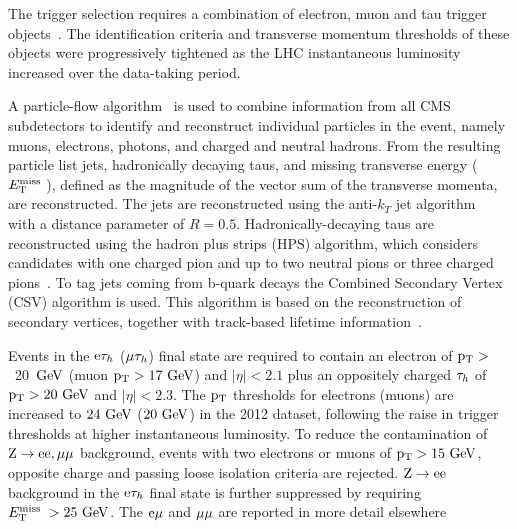 The trigger selection requires a combination of electron, muon and tau trigger objects~\cite{CMS-PAS-EGM-10-004,CMS-PAS-MUO-10-002,CMS-EWK-TAU}. The identification criteria and transverse momentum thresholds of these objects were progressively tightened as the LHC instantaneous luminosity increased over the data-taking period.

A particle-flow algorithm~\cite{CMS-PAS-PFT-09-001,CMS-PAS-PFT-10-002,CMS-PAS-PFT-10-003} is used to combine information from all CMS subdetectors to identify and reconstruct individual particles in the event, namely muons, electrons, photons, and charged and neutral hadrons. From the resulting particle list jets, hadronically decaying taus, and missing transverse energy ($E_\mathrm{T}^{\mathrm{miss}}\;$), defined as the magnitude of the vector sum of the transverse momenta, are reconstructed. 
The jets are reconstructed using the anti-$k_T$ jet algorithm~\cite{Cacciari:fastjet1,Cacciari:fastjet2} with a distance parameter of $R=0.5$. Hadronically-decaying taus are reconstructed using the hadron plus strips (HPS) algorithm, which considers candidates with one charged pion and up to two neutral pions or three charged pions~\cite{CMS-PAS-TAU-11-001}. To tag jets coming from b-quark decays the Combined Secondary Vertex (CSV) algorithm is used. This algorithm is based on the reconstruction of secondary vertices, together with track-based lifetime information~\cite{BTV-11-004}. 

Events in the $\mathrm{e}\mathrm{\tau}_h$ ($\mathrm{\mu}\mathrm{\tau}_h$) final state are required to contain
an electron of $\mathrm{p_{T}} >$~20~$\mathrm{GeV}$ (muon $\mathrm{p_{T}} >17~\mathrm{GeV}$) and $|\eta| < 2.1$ plus an oppositely charged $\mathrm{\tau}_h$ of $\mathrm{p_{T}} > 20~\mathrm{GeV}$ and $|\eta| < 2.3$.
The $\mathrm{p_{T}}$ thresholds for electrons (muons) are increased to $24~\mathrm{GeV}$ ($20~\mathrm{GeV}$) in the 2012 dataset,
following the raise in trigger thresholds at higher instantaneous luminosity.
To reduce the contamination of $\mathrm{Z}\to\mathrm{e}\mathrm{e}, \mathrm{\mu}\mathrm{\mu}$ background, events with two electrons or muons of $\mathrm{p_{T}} >15~\mathrm{GeV}$, opposite charge and passing loose isolation criteria are rejected.
$\mathrm{Z}\to\mathrm{e}\mathrm{e}$ background in the $\mathrm{e}\mathrm{\tau}_h$ final state is further suppressed by requiring $E_\mathrm{T}^{\mathrm{miss}}\; > 25~\mathrm{GeV}$.
The $\mathrm{e}\mathrm{\mu}$ and $\mathrm{\mu}\mathrm{\mu}$ are reported in more detail elsewhere %

